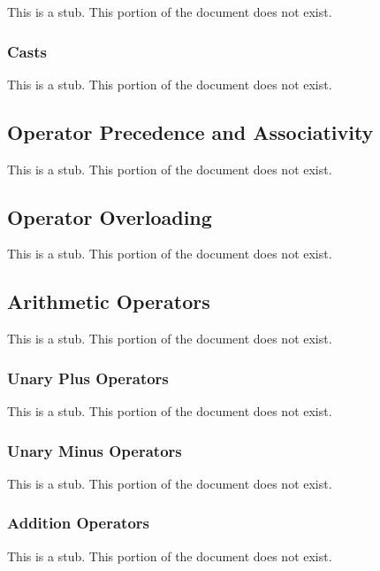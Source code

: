 This is a stub.  This portion of the document does not exist.

\subsubsection{Casts}
\label{Casts}

This is a stub.  This portion of the document does not exist.

\subsection{Operator Precedence and Associativity}
\label{Operator_Precedence_and_Associativity}

This is a stub.  This portion of the document does not exist.

\subsection{Operator Overloading}
\label{Operator_Overloading}

This is a stub.  This portion of the document does not exist.

\subsection{Arithmetic Operators}
\label{Arithmetic_Operators}

This is a stub.  This portion of the document does not exist.

\subsubsection{Unary Plus Operators}
\label{Unary_Plus_Operators}

This is a stub.  This portion of the document does not exist.

\subsubsection{Unary Minus Operators}
\label{Unary_Minus_Operators}

This is a stub.  This portion of the document does not exist.

\subsubsection{Addition Operators}
\label{Addition_Operators}

This is a stub.  This portion of the document does not exist.


